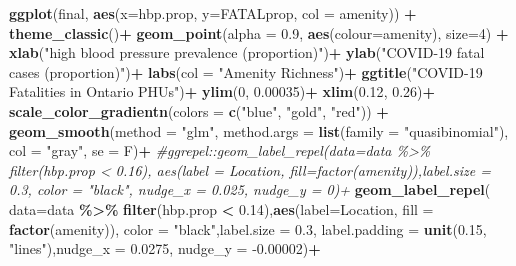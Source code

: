 \documentclass[]{article}
\newenvironment{Shaded}{\begin{snugshade}}{\end{snugshade}}
\newcommand{\CommentTok}[1]{\textcolor[rgb]{0.56,0.35,0.01}{\textit{#1}}}
\newcommand{\DataTypeTok}[1]{\textcolor[rgb]{0.13,0.29,0.53}{#1}}
\newcommand{\DecValTok}[1]{\textcolor[rgb]{0.00,0.00,0.81}{#1}}
\newcommand{\FloatTok}[1]{\textcolor[rgb]{0.00,0.00,0.81}{#1}}
\newcommand{\KeywordTok}[1]{\textcolor[rgb]{0.13,0.29,0.53}{\textbf{#1}}}
\newcommand{\NormalTok}[1]{#1}
\newcommand{\OperatorTok}[1]{\textcolor[rgb]{0.81,0.36,0.00}{\textbf{#1}}}
\newcommand{\StringTok}[1]{\textcolor[rgb]{0.31,0.60,0.02}{#1}}
\begin{document}
\begin{Shaded}
\begin{Highlighting}[]
\KeywordTok{ggplot}\NormalTok{(final, }\KeywordTok{aes}\NormalTok{(}\DataTypeTok{x=}\NormalTok{hbp.prop, }\DataTypeTok{y=}\NormalTok{FATALprop, }\DataTypeTok{col =}\NormalTok{ amenity)) }\OperatorTok{+}
\StringTok{  }\KeywordTok{theme\_classic}\NormalTok{()}\OperatorTok{+}
\StringTok{  }\KeywordTok{geom\_point}\NormalTok{(}\DataTypeTok{alpha =} \FloatTok{0.9}\NormalTok{, }\KeywordTok{aes}\NormalTok{(}\DataTypeTok{colour=}\NormalTok{amenity), }\DataTypeTok{size=}\DecValTok{4}\NormalTok{) }\OperatorTok{+}\StringTok{ }
\StringTok{  }\KeywordTok{xlab}\NormalTok{(}\StringTok{"high blood pressure prevalence (proportion)"}\NormalTok{)}\OperatorTok{+}
\StringTok{  }\KeywordTok{ylab}\NormalTok{(}\StringTok{"COVID{-}19 fatal cases (proportion)"}\NormalTok{)}\OperatorTok{+}
\StringTok{  }\KeywordTok{labs}\NormalTok{(}\DataTypeTok{col =} \StringTok{"Amenity Richness"}\NormalTok{)}\OperatorTok{+}
\StringTok{  }\KeywordTok{ggtitle}\NormalTok{(}\StringTok{"COVID{-}19 Fatalities in Ontario PHU\textquotesingle{}s"}\NormalTok{)}\OperatorTok{+}
\StringTok{  }\KeywordTok{ylim}\NormalTok{(}\DecValTok{0}\NormalTok{, }\FloatTok{0.00035}\NormalTok{)}\OperatorTok{+}
\StringTok{  }\KeywordTok{xlim}\NormalTok{(}\FloatTok{0.12}\NormalTok{, }\FloatTok{0.26}\NormalTok{)}\OperatorTok{+}
\StringTok{  }\KeywordTok{scale\_color\_gradientn}\NormalTok{(}\DataTypeTok{colors =} \KeywordTok{c}\NormalTok{(}\StringTok{"blue"}\NormalTok{, }\StringTok{"gold"}\NormalTok{, }\StringTok{"red"}\NormalTok{)) }\OperatorTok{+}
\KeywordTok{geom\_smooth}\NormalTok{(}\DataTypeTok{method =} \StringTok{"glm"}\NormalTok{, }\DataTypeTok{method.args =} \KeywordTok{list}\NormalTok{(}\DataTypeTok{family =} \StringTok{"quasibinomial"}\NormalTok{), }\DataTypeTok{col =} \StringTok{"gray"}\NormalTok{, }\DataTypeTok{se =}\NormalTok{ F)}\OperatorTok{+}
\CommentTok{\#ggrepel::geom\_label\_repel(data=data \%\textgreater{}\% filter(hbp.prop \textless{} 0.16), aes(label = Location, fill=factor(amenity)),label.size = 0.3, color = "black",  nudge\_x = 0.025, nudge\_y = 0)+}
\StringTok{  }
\KeywordTok{geom\_label\_repel}\NormalTok{( }\DataTypeTok{data=}\NormalTok{data }\OperatorTok{\%\textgreater{}\%}\StringTok{ }\KeywordTok{filter}\NormalTok{(hbp.prop }\OperatorTok{\textless{}}\StringTok{ }\FloatTok{0.14}\NormalTok{),}\KeywordTok{aes}\NormalTok{(}\DataTypeTok{label=}\NormalTok{Location, }\DataTypeTok{fill =} \KeywordTok{factor}\NormalTok{(amenity)), }\DataTypeTok{color =} \StringTok{"black"}\NormalTok{,}\DataTypeTok{label.size =} \FloatTok{0.3}\NormalTok{, }\DataTypeTok{label.padding =} \KeywordTok{unit}\NormalTok{(}\FloatTok{0.15}\NormalTok{, }\StringTok{"lines"}\NormalTok{),}\DataTypeTok{nudge\_x =} \FloatTok{0.0275}\NormalTok{, }\DataTypeTok{nudge\_y =} \FloatTok{{-}0.00002}\NormalTok{)}\OperatorTok{+}\StringTok{ }


\end{Highlighting}
\end{Shaded}
\end{document}

